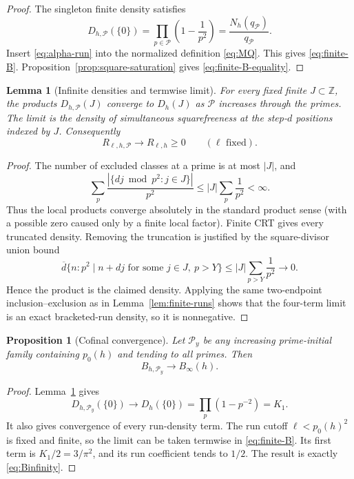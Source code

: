 \documentclass[11pt]{article}
\newtheorem{proposition}[theorem]{Proposition}
\newtheorem{lemma}[theorem]{Lemma}
\theoremstyle{definition}
\theoremstyle{remark}
\newcommand{\Z}{\mathbb Z}
\begin{document}
\begin{proof}
The singleton finite density satisfies
\[
 D_{h,\mathcal P}(\{0\})
 =\prod_{p\in\mathcal P}\left(1-\frac1{p^2}\right)
 =\frac{N_h(q_{\mathcal P})}{q_{\mathcal P}}.
\]
Insert \eqref{eq:alpha-run} into the normalized definition
\eqref{eq:MQ}.  This gives \eqref{eq:finite-B}.
Proposition~\ref{prop:square-saturation} gives
\eqref{eq:finite-B-equality}.
\end{proof}

\begin{lemma}[Infinite densities and termwise limit]
\label{lem:infinite-density}
For every fixed finite \(J\subset\Z\), the products
\(D_{h,\mathcal P}(J)\) converge to \(D_h(J)\) as
\(\mathcal P\) increases through the primes.  The limit is the density of
simultaneous squarefreeness at the step-\(d\) positions indexed by \(J\).
Consequently
\[
 R_{\ell,h,\mathcal P}\longrightarrow R_{\ell,h}\geq0
 \qquad(\ell\text{ fixed}).
\]
\end{lemma}

\begin{proof}
The number of excluded classes at a prime is at most \(|J|\), and
\[
 \sum_p\frac{|\{dj\bmod p^2:j\in J\}|}{p^2}
 \leq |J|\sum_p\frac1{p^2}<\infty.
\]
Thus the local products converge absolutely in the standard product
sense (with a possible zero caused only by a finite local factor).
Finite CRT gives every truncated density.  Removing the truncation is
justified by the square-divisor union bound
\[
 \overline d\{n:p^2\mid n+dj
 \text{ for some }j\in J,\ p>Y\}
 \leq |J|\sum_{p>Y}\frac1{p^2}\longrightarrow0.
\]
Hence the product is the claimed density.  Applying the same
two-endpoint inclusion--exclusion as in
Lemma~\ref{lem:finite-runs} shows that the four-term limit is an exact
bracketed-run density, so it is nonnegative.
\end{proof}

\begin{proposition}[Cofinal convergence]
\label{prop:cofinal}
Let \(\mathcal P_y\) be any increasing prime-initial family containing
\(p_0(h)\) and tending to all primes.  Then
\begin{equation}
 B_{h,\mathcal P_y}\longrightarrow B_\infty(h).
 \label{eq:cofinal-limit}
\end{equation}
\end{proposition}

\begin{proof}
Lemma~\ref{lem:infinite-density} gives
\[
 D_{h,\mathcal P_y}(\{0\})\longrightarrow
 D_h(\{0\})=\prod_p(1-p^{-2})=K_1.
\]
It also gives convergence of every run-density term.  The run cutoff
\(\ell<p_0(h)^2\) is fixed and finite, so the limit can be taken
termwise in \eqref{eq:finite-B}.  Its first term is
\(K_1/2=3/\pi^2\), and its run coefficient tends to \(1/2\).  The result
is exactly \eqref{eq:Binfinity}.
\end{proof}
\end{document}
